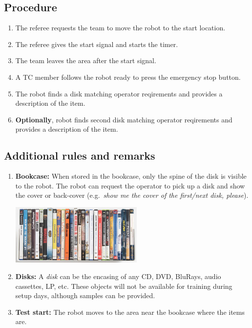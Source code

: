 \subsection*{Procedure}

\begin{enumerate}
	\item The referee requests the team to move the robot to the start location.
	\item The referee gives the start signal and starts the timer.
	\item The team leaves the area after the start signal.
	\item A TC member follows the robot ready to press the emergency stop button. 
	\item The robot finds a disk matching operator reqirements and provides a description of the item.
	\item \textbf{Optionally}, robot finds second disk matching operator reqirements and provides a description of the item.
\end{enumerate}

\subsection*{Additional rules and remarks}

\begin{enumerate}[nosep]
	\item \textbf{Bookcase:} When stored in the bookcase, only the spine of the disk is visible to the robot. The robot can request the operator to pick up a disk and show the cover or back-cover (e.g.~\textit{show me the cover of the first/next disk, please}).
	
		\begin{center}
	\includegraphics[width=\textwidth,height=3cm,keepaspectratio]{images/find_my_disk.png}
	\end{center}
	
	\item \textbf{Disks:} A \textit{disk} can be the encasing of any CD, DVD, BluRays, audio cassettes, LP, etc. These objects will not be available for training during setup days, although samples can be provided.
	\item \textbf{Test start:} The robot moves to the area near the bookcase where the items are.
\end{enumerate}

